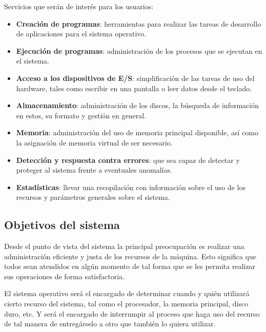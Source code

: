 Servicios que serán de interés para los usuarios:
\begin{itemize}

	\item \textbf{Creación de programas}: herramientas para realizar las
	tareas de desarrollo de aplicaciones para el sistema operativo.

	\item \textbf{Ejecución de programas}: administración de los procesos
	que se ejecutan en el sistema.

	\item \textbf{Acceso a los dispositivos de E/S}: simplificación de las
	tareas de uso del hardware, tales como escribir en una pantalla o leer
	datos desde el teclado.

	\item \textbf{Almacenamiento}: administración de los discos, la búsqueda
	de información en estos, su formato y gestión en general.

	\item \textbf{Memoria}: administración del uso de memoria principal
	disponible, así como la asignación de memoria virtual de ser necesario.

	\item \textbf{Detección y respuesta contra errores}: que sea capaz de
	detectar y proteger al sistema frente a eventuales anomalías.

	\item \textbf{Estadísticas}: llevar una recopilación con información
	sobre el uso de los recursos y parámetros generales sobre el sistema.

\end{itemize}

\subsection{Objetivos del sistema}

Desde el punto de vista del sistema la principal preocupación es realizar una
administración eficiente y justa de los recursos de la máquina. Esto significa
que todos sean atendidos en algún momento de tal forma que se les permita
realizar sus operaciones de forma satisfactoria.

El sistema operativo será el encargado de determinar cuando y quién utilizará
cierto recurso del sistema, tal como el procesador, la memoria principal, disco
duro, etc. Y será el encargado de interrumpir al proceso que haga uso del
recurso de tal manera de entregárselo a otro que también lo quiera utilizar.

